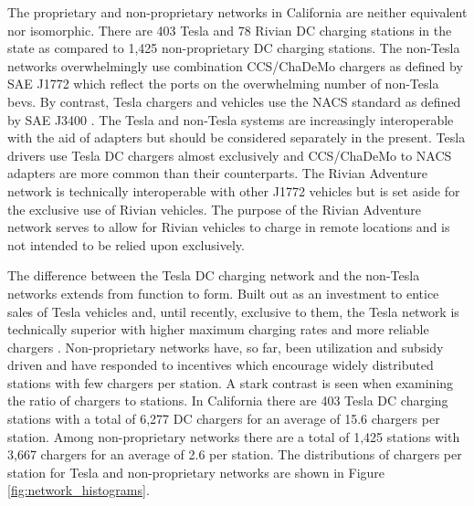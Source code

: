\documentclass[11pt]{article}
\begin{document}
\begin{multicols}{2}
The proprietary and non-proprietary networks in California are neither equivalent nor isomorphic. There are 403 Tesla and 78 Rivian DC charging stations in the state as compared to 1,425 non-proprietary DC charging stations. The non-Tesla networks overwhelmingly use combination CCS/ChaDeMo chargers as defined by SAE J1772 \cite{SAE_J1772} which reflect the ports on the overwhelming number of non-Tesla \glspl{bev}. By contrast, Tesla chargers and vehicles use the NACS standard as defined by SAE J3400 \cite{SAE_J3400}. The Tesla and non-Tesla systems are increasingly interoperable with the aid of adapters but should be considered separately in the present. Tesla drivers use Tesla DC chargers almost exclusively \cite{Visaria_2022} and CCS/ChaDeMo to NACS adapters are more common than their counterparts. The Rivian Adventure network is technically interoperable with other J1772 vehicles but is set aside for the exclusive use of Rivian vehicles. The purpose of the Rivian Adventure network serves to allow for Rivian vehicles to charge in remote locations and is not intended to be relied upon exclusively.

The difference between the Tesla DC charging network and the non-Tesla networks extends from function to form. Built out as an investment to entice sales of Tesla vehicles and, until recently, exclusive to them, the Tesla network is technically superior with higher maximum charging rates and more reliable chargers \cite{Rempel_2023, Kozumplik_2022}. Non-proprietary networks have, so far, been utilization and subsidy driven \cite{Gamage_2023} and have responded to incentives which encourage widely distributed stations with few chargers per station. A stark contrast is seen when examining the ratio of chargers to stations. In California there are 403 Tesla DC charging stations with a total of 6,277 DC chargers for an average of 15.6 chargers per station. Among non-proprietary networks there are a total of 1,425 stations with 3,667 chargers for an average of 2.6 per station. The distributions of chargers per station for Tesla and non-proprietary networks are shown in Figure \ref{fig:network_histograms}. 


\end{multicols}
\end{document}
